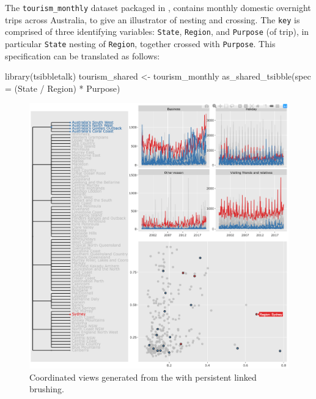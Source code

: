 The \texttt{tourism\_monthly} dataset \citep{tourism} packaged in
, contains monthly domestic overnight trips across
Australia, to give an illustrator of nesting and crossing. The
\texttt{key} is comprised of three identifying variables:
\texttt{State}, \texttt{Region}, and \texttt{Purpose} (of trip), in
particular \texttt{State} nesting of \texttt{Region}, together crossed
with \texttt{Purpose}. This specification can be translated as follows:

\begin{Schunk}
\begin{Sinput}
library(tsibbletalk)
tourism_shared <- tourism_monthly %
  as_shared_tsibble(spec = (State / Region) * Purpose)
\end{Sinput}
\end{Schunk}

\begin{Schunk}
\begin{figure}

{\centering \includegraphics[width=\textwidth]{img/tourism-linking} 

}

\caption[Coordinated views generated from the  with persistent linked brushing]{Coordinated views generated from the  with persistent linked brushing.}\label{fig:tourism-linking-fig}
\end{figure}
\end{Schunk}

